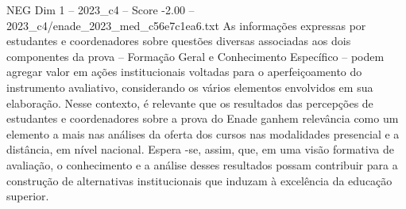 \begin{textsample}{NEG Dim 1 – 2023\_c4 – Score -2.00 – 2023\_c4/enade\_2023\_med\_c56e7c1ea6.txt}
As informações expressas por estudantes e coordenadores sobre questões diversas associadas aos dois componentes da prova – Formação Geral e Conhecimento Específico – podem agregar valor em ações institucionais voltadas para o aperfeiçoamento do instrumento avaliativo, considerando os vários elementos envolvidos em sua elaboração.
Nesse contexto, é relevante que os resultados das percepções de estudantes e coordenadores sobre a prova do Enade ganhem relevância como um elemento a mais nas análises da oferta dos cursos nas modalidades presencial e a distância, em nível nacional.
Espera -se, assim, que, em uma visão formativa de avaliação, o conhecimento e a análise desses resultados possam contribuir para a construção de alternativas institucionais que induzam à excelência da educação superior.

\end{textsample}
